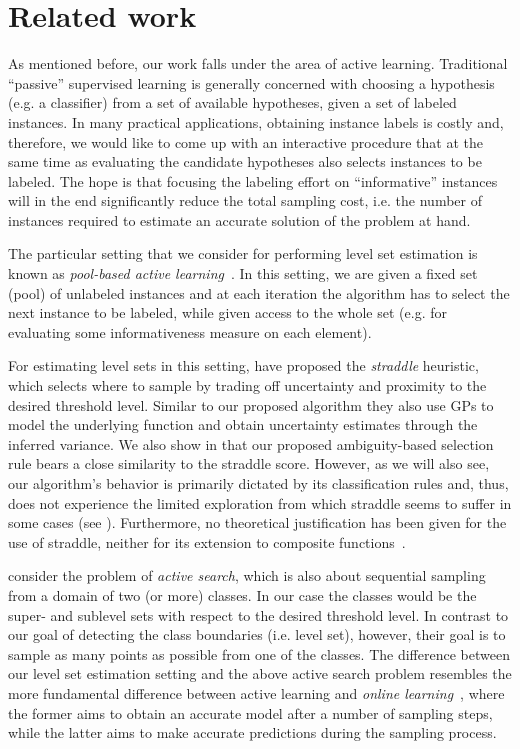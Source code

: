 \chapter{Related work} \label{ch:related}
As mentioned before, our work falls under the area of active learning.
Traditional ``passive'' supervised learning is generally concerned with
choosing a hypothesis (e.g. a classifier) from a set of available hypotheses,
given a set of labeled instances. In many practical applications, obtaining
instance labels is costly and, therefore, we would like to come up
with an interactive procedure that at the same time as evaluating the
candidate hypotheses also selects instances to be labeled. The hope is that
focusing the labeling effort on ``informative'' instances will in the end
significantly reduce the total sampling cost, i.e. the number of instances
required to estimate an accurate solution of the problem at hand.

The particular setting that we consider for performing level set estimation
is known as \emph{pool-based active learning}~\cite{settles12}. In this
setting, we are given a fixed set (pool) of unlabeled instances and at each
iteration the algorithm has to select the next instance to be labeled,
while given access to the whole set (e.g. for evaluating some informativeness
measure on each element).

For estimating level sets in this setting, \citet{bryan05} have proposed the
\emph{straddle} heuristic, which selects where to sample by trading off
uncertainty and proximity to the desired threshold level. Similar to our
proposed algorithm they also use GPs to model the underlying function and
obtain uncertainty estimates through the inferred variance. We also show
in  that our proposed ambiguity-based selection rule
bears a close similarity to the straddle score. However, as we will also see,
our algorithm's behavior is primarily dictated by its classification rules
and, thus, does not experience the limited exploration from which straddle
seems to suffer in some cases (see ).
Furthermore, no theoretical justification has been given for the use of
straddle, neither for its extension to composite functions~\cite{bryan08}.

\citet{garnett12} consider the problem of
\emph{active search}, which is also about sequential sampling from a domain of
two (or more) classes. In our case the classes would be the super- and sublevel
sets with respect to the desired threshold level.
In contrast to our goal of detecting the class boundaries (i.e. level set),
however, their goal is to sample as many points as possible from one of the
classes. The difference between our level set estimation setting and the above
active search problem resembles the more fundamental difference between active
learning and
\emph{online learning}~\cite{shalev12}, where the former aims to obtain
an accurate model after a number of sampling steps, while the latter aims
to make accurate predictions during the sampling process.

